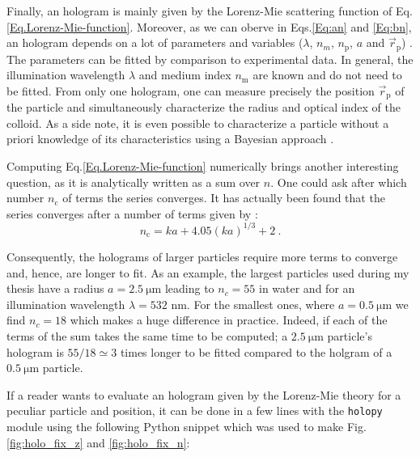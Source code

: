 Finally, an hologram is mainly given by the Lorenz-Mie scattering function of Eq.\ref{Eq.Lorenz-Mie-function}. Moreover, as we can oberve in Eqs.\ref{Eq:an} and \ref{Eq:bn}, an hologram depends on a lot of parameters and variables ($\lambda$, $n_m$, $n_\mathrm{p}$, $a$ and $\vec{r}_\mathrm{p}$) . The parameters can be fitted by comparison to experimental data. In general, the illumination wavelength $\lambda$ and medium index $n_\mathrm{m}$ are known and do not need to be fitted. From only one hologram, one can measure precisely the position $\vec{r}_\mathrm{p}$ of the particle and simultaneously characterize the radius and optical index of the colloid. As a side note, it is even possible to characterize a particle without a priori knowledge of its characteristics using a Bayesian approach \cite{gregory_bayesian_2005, dimiduk_bayesian_2016}.

Computing Eq.\ref{Eq.Lorenz-Mie-function} numerically brings another interesting question, as it is analytically written as a sum over $n$. One could ask after which number $n_\mathrm{c}$ of terms the series converges. It has actually been found that the series converges after a number of terms given by \cite{lentz_generating_1976}:
\begin{equation}
	n_\mathrm{c} = k a + 4.05 (k a)^{1/3} + 2 ~.
\end{equation}

Consequently, the holograms of larger particles require more terms to converge and, hence, are longer to fit. As an example, the largest particles used during my thesis have a radius $a = 2.5 ~ \mathrm{\mu m}$ leading to $ n_c = 55$ in water and for an illumination wavelength $\lambda = 532$ nm. For the smallest ones, where $a = 0.5 ~ \mathrm{\mu m}$ we find $n_c = 18$ which makes a huge difference in practice. Indeed, if each of the terms of the sum takes the same time to be computed; a $2.5 ~ \mathrm{\mu m}$ particle's hologram is $55/18 \simeq 3$ times longer to be fitted compared to the holgram of a $0.5 ~ \mathrm{\mu m}$ particle.

If a reader wants to evaluate an hologram given by the Lorenz-Mie theory for a peculiar particle and position, it can be done in a few lines with the \texttt{holopy} module using the following Python snippet which was used to make Fig.\ref{fig:holo_fix_z} and \ref{fig:holo_fix_n}:

